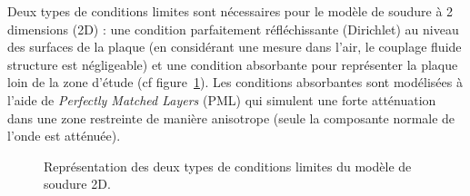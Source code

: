 Deux types de conditions limites sont nécessaires pour le modèle de soudure à 2 dimensions (2D) : une condition parfaitement réfléchissante (Dirichlet) au niveau des surfaces de la plaque (en considérant une mesure dans l'air, le couplage fluide structure est négligeable) et une condition absorbante pour représenter la plaque loin de la zone d'étude (cf figure~\ref{BC}). Les conditions absorbantes sont modélisées à l'aide de \emph{Perfectly Matched Layers} (PML) qui simulent une forte atténuation dans une zone restreinte de manière anisotrope (seule la composante normale de l'onde est atténuée).

\begin{figure}[!h]
	\centering
	\caption{Représentation des deux types de conditions limites du modèle de soudure 2D.\label{BC}}
\end{figure}

